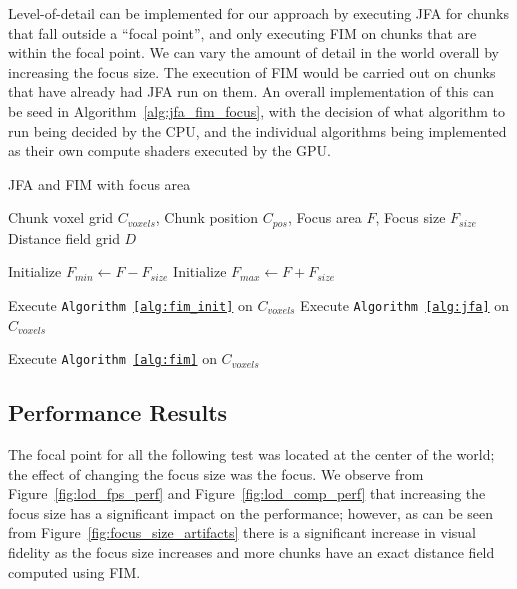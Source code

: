 Level-of-detail can be implemented for our approach by executing JFA for chunks that fall outside a ``focal point'',
and only executing FIM on chunks that are within the focal point. We can vary the amount of detail in the world overall
by increasing the focus size. The execution of FIM would be carried out on chunks that have already had JFA run on
them. An overall implementation of this can be seed in Algorithm~\ref{alg:jfa_fim_focus}, with the decision of what
algorithm to run being decided by the CPU, and the individual algorithms being implemented as their own compute shaders
executed by the GPU.

\begin{algorithm}[H]
    \caption{JFA and FIM with focus area}
    \label{alg:jfa_fim_focus}
    \begin{algorithmic}[1]
        \REQUIRE Chunk voxel grid \(C_{voxels}\), Chunk position \(C_{pos}\), Focus area \(F\), Focus size \(F_{size}\)
        \ENSURE Distance field grid \(D\)

        \STATE Initialize $F_{min} \gets F - F_{size}$
        \STATE Initialize $F_{max} \gets F + F_{size}$

        \STATE Execute \texttt{Algorithm~\ref{alg:fim_init}} on $C_{voxels}$
        \STATE Execute \texttt{Algorithm~\ref{alg:jfa}} on $C_{voxels}$

        \STATE Execute \texttt{Algorithm~\ref{alg:fim}} on $C_{voxels}$
        \ENDIF
    \end{algorithmic}
\end{algorithm}

\subsection{Performance Results}
The focal point for all the following test was located at the center of the world; the effect of changing the focus size
was the focus. We observe from Figure~\ref{fig:lod_fps_perf} and Figure~\ref{fig:lod_comp_perf} that increasing the
focus size has a significant impact on the performance; however, as can be seen from
Figure~\ref{fig:focus_size_artifacts} there is a significant increase in visual fidelity as the focus size increases and
more chunks have an exact distance field computed using FIM.


